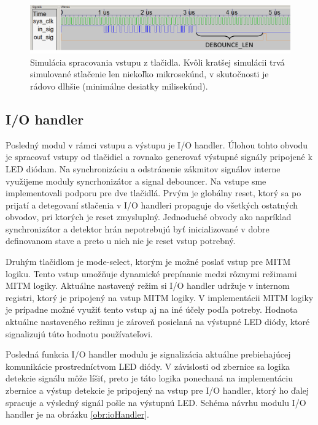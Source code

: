 \begin{figure}
    \centerline{\includegraphics[width=1\textwidth]{images/simulations/debouncerSim.png}}
    \caption[Simulácia spracovania vstupu z tlačidla]{Simulácia spracovania vstupu z tlačidla. Kvôli kratšej simulácii trvá simulované stlačenie len niekoľko mikrosekúnd, v skutočnosti je rádovo dlhšie (minimálne desiatky milisekúnd).}
    \label{obr:debouncerSim}
\end{figure}

\subsection{I/O handler}
Posledný modul v rámci vstupu a výstupu je I/O handler. Úlohou tohto obvodu je spracovať vstupy od tlačidiel a rovnako generovať výstupné signály pripojené k LED diódam. Na synchronizáciu a odstránenie zákmitov signálov interne využijeme moduly syncrhonizátor a signal debouncer.  Na vstupe sme implementovali podporu pre dve tlačidlá. Prvým je globálny reset, ktorý sa po prijatí a detegovaní stlačenia v I/O handleri propaguje do všetkých ostatných obvodov, pri ktorých je reset zmysluplný. Jednoduché obvody ako napríklad synchronizátor a detektor hrán nepotrebujú byť inicializované v dobre definovanom stave a preto u nich nie je reset vstup potrebný.

Druhým tlačidlom je mode-select, ktorým je možné poslať vstup pre MITM logiku. Tento vstup umožňuje dynamické prepínanie medzi rôznymi režimami MITM logiky. Aktuálne nastavený režim si I/O handler udržuje v internom registri, ktorý je pripojený na vstup MITM logiky. V implementácii MITM logiky je prípadne možné využiť tento vstup aj na iné účely podľa potreby. Hodnota aktuálne nastaveného režimu je zároveň posielaná na výstupné LED diódy, ktoré signalizujú túto hodnotu používateľovi.

Posledná funkcia I/O handler modulu je signalizácia aktuálne prebiehajúcej komunikácie prostredníctvom LED diódy. V závislosti od zbernice sa logika detekcie signálu môže líšiť, preto je táto logika ponechaná na implementáciu zbernice a výstup detekcie je pripojený na vstup pre I/O handler, ktorý ho ďalej spracuje a výsledný signál pošle na výstupnú LED. Schéma návrhu modulu I/O handler je na obrázku \ref{obr:ioHandler}.


